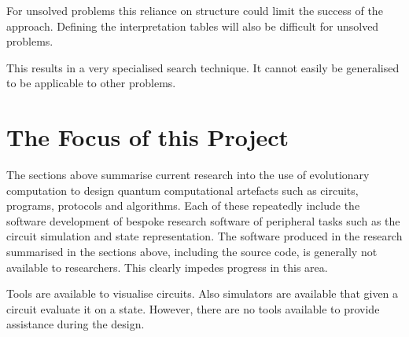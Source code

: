 For unsolved problems this reliance on structure could limit the success of the approach.
Defining the interpretation tables will also be difficult for unsolved problems.

This results in a very specialised search technique.
It cannot easily be generalised to be applicable to other problems.


\section{The Focus of this Project}
\label{sec:focusofproject}
The sections above summarise current research into the use of evolutionary computation to design quantum computational artefacts such as circuits, programs, protocols and algorithms.
Each of these repeatedly include the software development of bespoke research software of peripheral tasks such as the circuit simulation and state representation.
The software produced in the research summarised in the sections above, including the source code, is generally not available to researchers.
This clearly impedes progress in this area.


Tools are available to visualise circuits.
Also simulators are available that given a circuit evaluate it on a state.
However, there are no tools available to provide assistance during the design.

